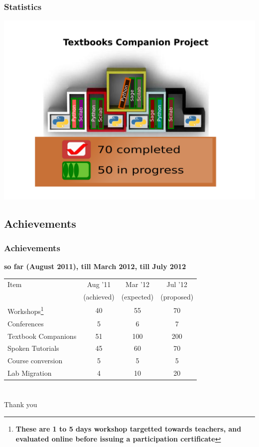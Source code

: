 \documentclass[compress,red]{beamer} %
\begin{document}
\begin{frame}
\frametitle{Statistics}
\begin{center}
\includegraphics[scale=.15]{textbook.png}
\end{center}
\end{frame}

\subsection{Achievements}	
\begin{frame}
\frametitle{Achievements}
\small \bf
{\bf so far (August 2011), till March 2012, till July 2012}
\begin{center}
\begin{table}[h]
\begin{tabular}{|l|c|c|c|}
\hline 
Item & Aug '11 & Mar '12 & Jul '12 \tabularnewline
& (achieved) & (expected) & (proposed) \tabularnewline
\hline
\hline 
Workshops\footnote{\bf These are 1 to 5 days workshop targetted towards
\alert{teachers}, and \alert{evaluated online} before issuing a participation
certificate}  & 40 &  55 & 70\tabularnewline
\hline 
Conferences & 5 & 6 & 7 \tabularnewline
\hline 
Textbook Companions & 51 & 100 & 200 \tabularnewline
\hline 
Spoken Tutorials & 45 & 60 & 70 \tabularnewline
\hline 
Course conversion & 5 & 5 & 5\tabularnewline
\hline
Lab Migration & 4 & 10 & 20 \tabularnewline
\hline
\end{tabular}
\end{table}
\end{center}
\end{frame}

\section*{}
\begin{frame}
    \begin{center}
        \huge
        Thank you\\ \pause
    \end{center}
\end{frame}
\end{document}
